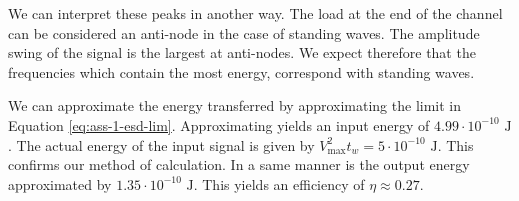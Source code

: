\documentclass[11pt,titlepage]{report}
\begin{document}
We can interpret these peaks in another way. The load at the end of the channel can be considered an anti-node in the case of standing waves. The amplitude swing of the signal is the largest at anti-nodes. We expect therefore that the frequencies which contain the most energy, correspond with standing waves.

We can approximate the energy transferred by approximating the limit in Equation \ref{eq:ass-1-esd-lim}. Approximating yields an input energy of $4.99 \cdot 10^{-10} \text{ J}$. The actual energy of the input signal is given by $V_{\text{max}}^2 t_w =5 \cdot 10^{-10} \text{ J}$. This confirms our method of calculation. In a same manner is the output energy approximated by $1.35 \cdot 10^{-10} \text{ J}$. This yields an efficiency of $\eta\approx0.27$.
\end{document}
